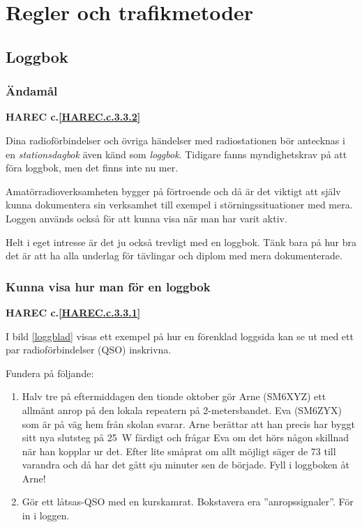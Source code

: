 \chapter{Regler och trafikmetoder}

\section{Loggbok}

\subsection{Ändamål}
\textbf{HAREC
  c.\ref{HAREC.c.3.3.2}\label{myHAREC.c.3.3.2}
}

Dina radioförbindelser och övriga händelser med radiostationen bör
antecknas i en \emph{stationsdagbok} även känd som \emph{loggbok}.
Tidigare fanns myndighetskrav på att föra loggbok, men det finns inte nu mer.

Amatörradioverksamheten bygger på förtroende och då är det viktigt att själv
kunna dokumentera sin verksamhet till exempel i störningssituationer med mera.
Loggen används också för att kunna visa när man har varit aktiv.

Helt i eget intresse är det ju också trevligt med en loggbok.
Tänk bara på hur bra det är att ha alla underlag för tävlingar och diplom
med mera dokumenterade.

\subsection{Kunna visa hur man för en loggbok}
\textbf{HAREC
  c.\ref{HAREC.c.3.3.1}\label{myHAREC.c.3.3.1}
}

I bild \ref{loggblad} visas ett exempel på hur en förenklad loggsida kan se ut
med ett par radioförbindelser (QSO) inskrivna.

Fundera på följande:
\begin{enumerate}
\item Halv tre på eftermiddagen den tionde oktober gör Arne (SM6XYZ)
  ett allmänt anrop på den lokala repeatern på 2-metersbandet.
  Eva (SM6ZYX) som är på väg hem från skolan svarar.
  Arne berättar att han precis har byggt sitt nya slutsteg på 25~W
  färdigt och frågar Eva om det hörs någon skillnad när han kopplar ur det.
  Efter lite småprat om allt möjligt säger de 73 till varandra och då har det
  gått sju minuter sen de började.
  Fyll i loggboken åt Arne!
\item Gör ett låtsas-QSO med en kurskamrat.
  Bokstavera era ''anropssignaler''.
  För in i loggen.
\end{enumerate}

